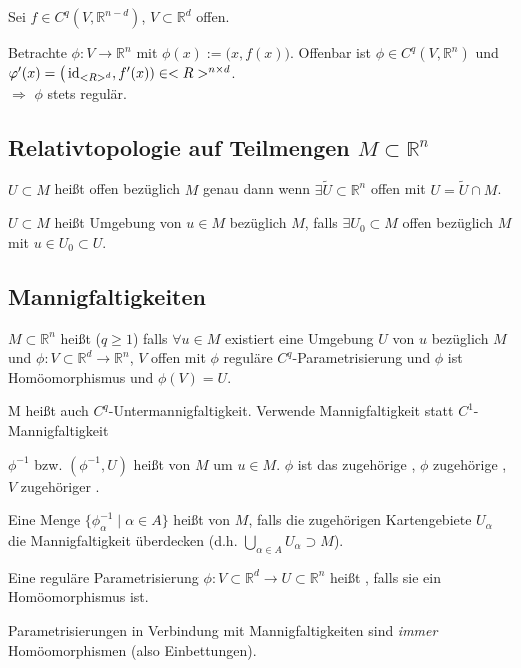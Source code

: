 \begin{example}
	Sei $f\in C^q(V, \mathbb{R}^{n-d})$, $V\subset \mathbb{R}^d$ offen.
	
	Betrachte $\phi\colon V\to \mathbb{R}^n$ mit $\phi(x) := \big(x, f(x)\big)$. Offenbar ist $\phi \in C^q(V, \mathbb{R}^n)$ und $\varphi'(x) = \big( \operatorname{id}_{<R>^d}, f'(x)) \in <R>^{n\times d}$. \\
	$\Rightarrow$ $\phi$ stets regulär.
\end{example}

\subsection{Relativtopologie auf Teilmengen \texorpdfstring{$M\subset \mathbb{R}^n$}{M c R}}
\begin{*definition}
	$U\subset M$ heißt offen bezüglich $M$ genau dann wenn $\exists \tilde{U} \subset \mathbb{R}^n$ offen mit $U = \tilde{U} \cap M$.
	
	$U\subset M$ heißt Umgebung von $u\in M$ bezüglich $M$, falls $\exists U_0 \subset M$ offen bezüglich $M$ mit $u\in U_0 \subset U$.
\end{*definition}

\subsection{Mannigfaltigkeiten}
\begin{*definition}
	$M\subset \mathbb{R}^n$ heißt  ($q \ge 1$) falls $\forall u\in M$ existiert eine Umgebung $U$ von $u$ bezüglich $M$ und $\phi\colon V\subset \mathbb{R}^d \to \mathbb{R}^n$, $V$ offen mit $\phi$ reguläre $C^q$-Parametrisierung und $\phi$ ist Homöomorphismus und $\phi(V) = U$.
	
	M heißt auch $C^q$-Untermannigfaltigkeit. Verwende Mannigfaltigkeit statt $C^1$-Mannigfaltigkeit
\end{*definition}
\begin{*definition}
	$\phi^{-1}$ bzw. $(\phi^{-1}, U)$ heißt  von $M$ um $u\in M$. $\phi$ ist das zugehörige , $\phi$ zugehörige , $V$ zugehöriger .
	
	Eine Menge $\lbrace \phi^{-1}_\alpha \mid \alpha \in A\rbrace$ heißt  von $M$, falls die zugehörigen Kartengebiete $U_\alpha$ die Mannigfaltigkeit überdecken (d.h. $\bigcup_{\alpha\in A} U_\alpha \supset M$).
\end{*definition}
\begin{*definition}
	Eine reguläre Parametrisierung $\phi\colon V\subset \mathbb{R}^d\to U\subset \mathbb{R}^n$ heißt , falls sie ein Homöomorphismus ist.
\end{*definition}
\begin{underlinedenvironment}[Vereinbarung]
	Parametrisierungen in Verbindung mit Mannigfaltigkeiten sind \emph{immer} Homöomorphismen (also Einbettungen).
\end{underlinedenvironment}

